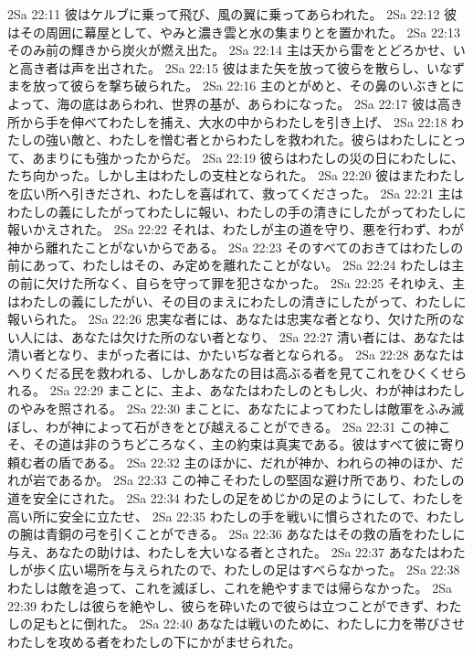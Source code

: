 2Sa 22:11  彼はケルブに乗って飛び、風の翼に乗ってあらわれた。
2Sa 22:12  彼はその周囲に幕屋として、やみと濃き雲と水の集まりとを置かれた。
2Sa 22:13  そのみ前の輝きから炭火が燃え出た。
2Sa 22:14  主は天から雷をとどろかせ、いと高き者は声を出された。
2Sa 22:15  彼はまた矢を放って彼らを散らし、いなずまを放って彼らを撃ち破られた。
2Sa 22:16  主のとがめと、その鼻のいぶきとによって、海の底はあらわれ、世界の基が、あらわになった。
2Sa 22:17  彼は高き所から手を伸べてわたしを捕え、大水の中からわたしを引き上げ、
2Sa 22:18  わたしの強い敵と、わたしを憎む者とからわたしを救われた。彼らはわたしにとって、あまりにも強かったからだ。
2Sa 22:19  彼らはわたしの災の日にわたしに、たち向かった。しかし主はわたしの支柱となられた。
2Sa 22:20  彼はまたわたしを広い所へ引きだされ、わたしを喜ばれて、救ってくださった。
2Sa 22:21  主はわたしの義にしたがってわたしに報い、わたしの手の清きにしたがってわたしに報いかえされた。
2Sa 22:22  それは、わたしが主の道を守り、悪を行わず、わが神から離れたことがないからである。
2Sa 22:23  そのすべてのおきてはわたしの前にあって、わたしはその、み定めを離れたことがない。
2Sa 22:24  わたしは主の前に欠けた所なく、自らを守って罪を犯さなかった。
2Sa 22:25  それゆえ、主はわたしの義にしたがい、その目のまえにわたしの清きにしたがって、わたしに報いられた。
2Sa 22:26  忠実な者には、あなたは忠実な者となり、欠けた所のない人には、あなたは欠けた所のない者となり、
2Sa 22:27  清い者には、あなたは清い者となり、まがった者には、かたいぢな者となられる。
2Sa 22:28  あなたはへりくだる民を救われる、しかしあなたの目は高ぶる者を見てこれをひくくせられる。
2Sa 22:29  まことに、主よ、あなたはわたしのともし火、わが神はわたしのやみを照される。
2Sa 22:30  まことに、あなたによってわたしは敵軍をふみ滅ぼし、わが神によって石がきをとび越えることができる。
2Sa 22:31  この神こそ、その道は非のうちどころなく、主の約束は真実である。彼はすべて彼に寄り頼む者の盾である。
2Sa 22:32  主のほかに、だれが神か、われらの神のほか、だれが岩であるか。
2Sa 22:33  この神こそわたしの堅固な避け所であり、わたしの道を安全にされた。
2Sa 22:34  わたしの足をめじかの足のようにして、わたしを高い所に安全に立たせ、
2Sa 22:35  わたしの手を戦いに慣らされたので、わたしの腕は青銅の弓を引くことができる。
2Sa 22:36  あなたはその救の盾をわたしに与え、あなたの助けは、わたしを大いなる者とされた。
2Sa 22:37  あなたはわたしが歩く広い場所を与えられたので、わたしの足はすべらなかった。
2Sa 22:38  わたしは敵を追って、これを滅ぼし、これを絶やすまでは帰らなかった。
2Sa 22:39  わたしは彼らを絶やし、彼らを砕いたので彼らは立つことができず、わたしの足もとに倒れた。
2Sa 22:40  あなたは戦いのために、わたしに力を帯びさせわたしを攻める者をわたしの下にかがませられた。
